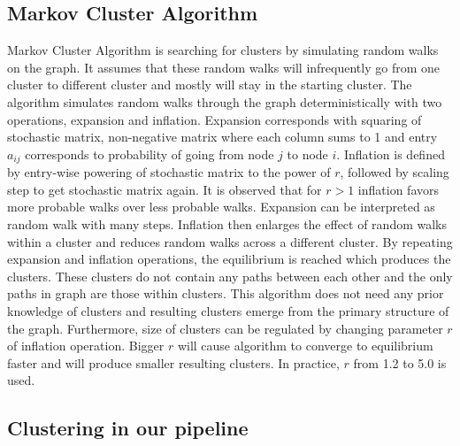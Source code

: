 \subsection{Markov Cluster Algorithm}
Markov Cluster Algorithm is searching for clusters by simulating random walks on the graph. 
It assumes that these random walks will infrequently go from one cluster to different cluster and mostly will stay in the starting cluster.
The algorithm simulates random walks through the graph deterministically with two operations, expansion and inflation.
Expansion corresponds with squaring of stochastic matrix, non-negative matrix where each column sums to 1 and entry $a_{ij}$ corresponds to probability of going from node $j$ to node $i$.
Inflation is defined by entry-wise powering of stochastic matrix to the power of $r$, followed by scaling step to get stochastic matrix again.
It is observed that for $r>1$ inflation favors more probable walks over less probable walks.
Expansion can be interpreted as random walk with many steps.
Inflation then enlarges the effect of random walks within a cluster and reduces random walks across a different cluster.
By repeating expansion and inflation operations, the equilibrium is reached which produces the clusters.
These clusters do not contain any paths between each other and the only paths in graph are those within clusters.
This algorithm does not need any prior knowledge of clusters and resulting clusters emerge from the primary structure of the graph.
Furthermore, size of clusters can be regulated by changing parameter $r$ of inflation operation.
Bigger $r$ will cause algorithm to converge to equilibrium faster and will produce smaller resulting clusters.
In practice, $r$ from 1.2 to 5.0 is used.


\subsection{Clustering in our pipeline}
